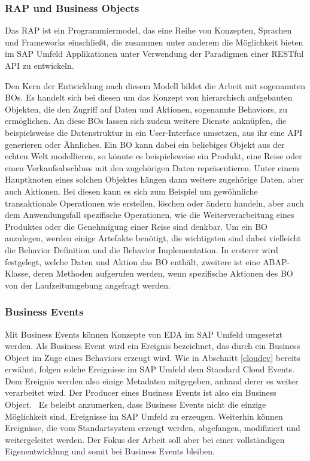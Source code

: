 \subsubsection*{RAP und Business Objects}
Das \acl{RAP} ist ein Programmiermodel, das eine Reihe von Konzepten, Sprachen und Frameworks einschließt, die zusammen unter anderem die Möglichkeit bieten im SAP Umfeld Applikationen unter Verwendung der Paradigmen einer \ac*{REST}ful \ac{API} zu entwickeln. \cite[Vgl.][]{sapse_rap} 

Den Kern der Entwicklung nach diesem Modell bildet die Arbeit mit sogenannten \ac{BO}s. Es handelt sich bei diesen um das Konzept von hierarchisch aufgebauten Objekten, die den Zugriff auf Daten und Aktionen, sogenannte Behaviors, zu ermöglichen. An diese \ac{BO}s lassen sich zudem weitere Dienste anknüpfen, die beispielsweise die Datenstruktur in ein User-Interface umsetzen, aus ihr eine \ac{API} generieren oder Ähnliches. Ein \ac{BO} kann dabei ein beliebiges Objekt aus der echten Welt modellieren, so könnte es beispielsweise ein Produkt, eine Reise oder einen Verkaufsabschluss mit den zugehörigen Daten repräsentieren. Unter einem Hauptknoten eines solchen Objektes hängen dann weitere zugehörige Daten, aber auch Aktionen. Bei diesen kann es sich zum Beispiel um gewöhnliche transaktionale Operationen wie erstellen, löschen oder ändern handeln, aber auch dem Anwendungsfall spezifische Operationen, wie die Weiterverarbeitung eines Produktes oder die Genehmigung einer Reise sind denkbar. Um ein \ac{BO} anzulegen, werden einige Artefakte benötigt, die wichtigsten sind dabei vielleicht die Behavior Definition und die Behavior Implementation. In ersterer wird festgelegt, welche Daten und Aktion das \ac{BO} enthält, zweitere ist eine \ac{ABAP}-Klasse, deren Methoden aufgerufen werden, wenn spezifische Aktionen des \ac{BO} von der Laufzeitumgebung angefragt werden. \cite[Vgl.][]{sapse_rap}

\subsubsection*{Business Events}
Mit Business Events können Konzepte von \ac{EDA} im SAP Umfeld umgesetzt werden. Als Business Event wird ein Ereignis bezeichnet, das durch ein Business Object im Zuge eines Behaviors erzeugt wird. Wie in Abschnitt \ref{cloudev} bereits erwähnt, folgen solche Ereignisse im SAP Umfeld dem Standard Cloud Events. Dem Ereignis werden also einige Metadaten mitgegeben, anhand derer es weiter verarbeitet wird. Der Producer eines Business Events ist also ein Business Object.\ \cite[Vgl.][]{sapse_bes} Es beleibt anzumerken, dass Business Events nicht die einzige Möglichkeit sind, Ereignisse im SAP Umfeld zu erzeugen. Weiterhin können Ereignisse, die vom Standartsystem erzeugt werden, abgefangen, modifiziert und weitergeleitet werden. Der Fokus der Arbeit soll aber bei einer vollständigen Eigenentwicklung und somit bei Business Events bleiben.

